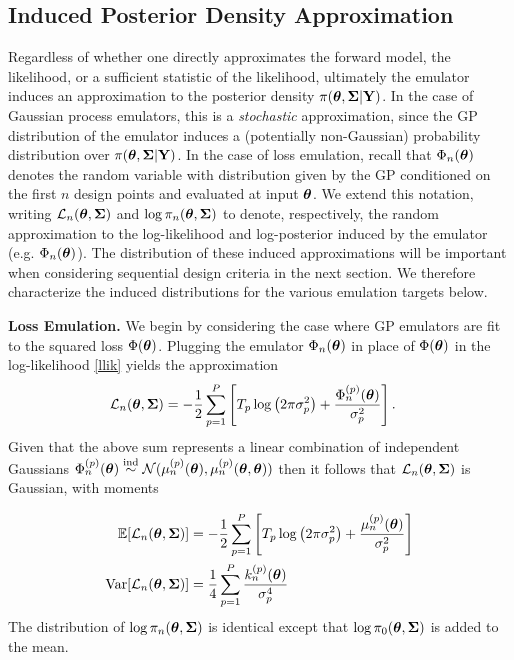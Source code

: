 \documentclass[12pt]{article}
\begin{document}
\subsection{Induced Posterior Density Approximation}
Regardless of whether one directly approximates the forward model, the likelihood, or a sufficient statistic of the likelihood, ultimately the emulator induces an approximation to the posterior 
density $\pi(\boldsymbol{\theta}, \boldsymbol{\Sigma}|\mathbf{Y})$. In the case of Gaussian process emulators, this is a \textit{stochastic} approximation, since the GP distribution of the emulator induces 
a (potentially non-Gaussian) probability distribution over $\pi(\boldsymbol{\theta}, \boldsymbol{\Sigma}|\mathbf{Y})$. In the case of loss emulation, recall that $\Phi_{n}(\boldsymbol{\theta})$ denotes the random 
variable with distribution given by the GP conditioned on the first $n$ design points and evaluated at input $\boldsymbol{\theta}$. We extend this notation, writing $\mathcal{L}_{n}(\boldsymbol{\theta}, \boldsymbol{\Sigma})$ and 
$\log \pi_{n}(\boldsymbol{\theta}, \boldsymbol{\Sigma})$ to denote, respectively, the random approximation to the log-likelihood and log-posterior induced by the emulator (e.g. $\Phi_n(\boldsymbol{\theta})$). The distribution of 
these induced approximations will be important when considering sequential design criteria in the next section. We therefore characterize the induced distributions for the various emulation 
targets below. 

\bigskip
\noindent
\textbf{Loss Emulation.} We begin by considering the case where GP emulators are fit to the squared loss $\Phi(\boldsymbol{\theta})$. Plugging the emulator $\Phi_n(\boldsymbol{\theta})$ in place of $\Phi(\boldsymbol{\theta})$ in the log-likelihood
\ref{llik} yields the approximation 
\begin{align*}
\mathcal{L}_{n}(\boldsymbol{\theta}, \boldsymbol{\Sigma}) &= -\frac{1}{2} \sum_{p = 1}^{P} \left[T_{p} \log\left(2\pi \sigma_{p}^2 \right) + \frac{\Phi_{n}^{(p)}(\boldsymbol{\theta})}{\sigma_{p}^2} \right].
\end{align*}
Given that the above sum represents a linear combination of independent Gaussians 
$\Phi_{n}^{(p)}(\boldsymbol{\theta}) \overset{\text{ind}}{\sim} \mathcal{N}(\mu_{n}^{(p)}(\boldsymbol{\theta}), \mu_{n}^{(p)}(\boldsymbol{\theta}, \boldsymbol{\theta}))$ then it follows that 
$\mathcal{L}_{n}(\boldsymbol{\theta}, \boldsymbol{\Sigma})$ is Gaussian, with moments 

\begin{align}
\E[\llik_{\designidx}(\bpar, \CovObs)] &= -\frac{1}{2} \sum_{\outidx = 1}^{\Nout} \left[\Ntime_{\outidx} \log\left(2\postDens \sdOut_{\outidx}^2 \right) + \frac{\GPMeanPredOut{\designidx}{\outidx}(\bpar)}{\sdOut_{\outidx}^2} \right] \label{loss_emulation_dist} \\
\Var[\llik_{\designidx}(\bpar, \CovObs)] &= \frac{1}{4} \sum_{\outidx = 1}^{\Nout} \frac{\GPKerPredOut{\designidx}{\outidx}(\bpar)}{\sdOut_{\outidx}^4} \noindent
\end{align}
The distribution of $\log \pi_{n}(\boldsymbol{\theta}, \boldsymbol{\Sigma})$ is identical except that $\log \pi_0(\boldsymbol{\theta}, \boldsymbol{\Sigma})$ is added to the mean. 
\end{document}
